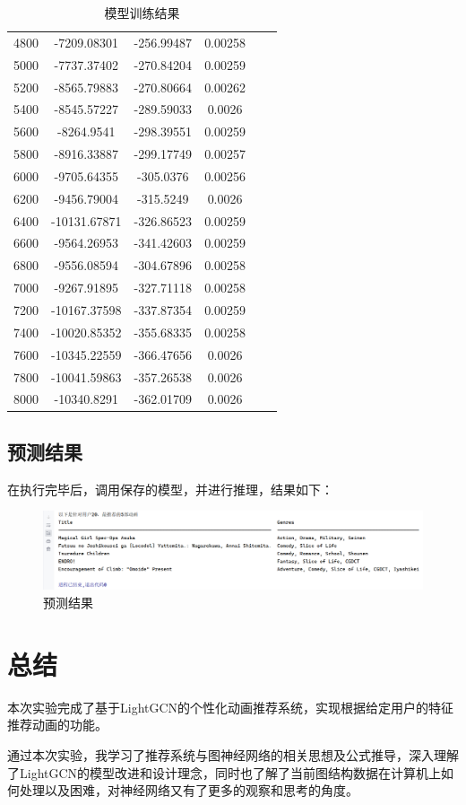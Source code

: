 \documentclass[hyperref,a4paper,UTF8]{ctexart}
\begin{document}
\begin{table}[ht]
\begin{tabular}{l|c|c|c|c|c|}
        4800      & -7209.08301  & -256.99487  & 0.00258   \\
        5000      & -7737.37402  & -270.84204  & 0.00259   \\
        5200      & -8565.79883  & -270.80664  & 0.00262   \\
        5400      & -8545.57227  & -289.59033  & 0.0026    \\
        5600      & -8264.9541   & -298.39551  & 0.00259   \\
        5800      & -8916.33887  & -299.17749  & 0.00257   \\
        6000      & -9705.64355  & -305.0376   & 0.00256   \\
        6200      & -9456.79004  & -315.5249   & 0.0026    \\
        6400      & -10131.67871 & -326.86523  & 0.00259   \\
        6600      & -9564.26953  & -341.42603  & 0.00259   \\
        6800      & -9556.08594  & -304.67896  & 0.00258   \\
        7000      & -9267.91895  & -327.71118  & 0.00258   \\
        7200      & -10167.37598 & -337.87354  & 0.00259   \\
        7400      & -10020.85352 & -355.68335  & 0.00258   \\
        7600      & -10345.22559 & -366.47656  & 0.0026    \\
        7800      & -10041.59863 & -357.26538  & 0.0026    \\
        8000      & -10340.8291  & -362.01709  & 0.0026    \\
        \bottomrule
    \end{tabular}
    \caption{模型训练结果}
    \label{tab:model_trsain_result}
\end{table}

\subsection{预测结果}

在执行完毕后，调用保存的模型，并进行推理，结果如下：

\begin{figure}[ht]
    \centering
    \includegraphics[width=1.0\textwidth]{fig/predict.png}
    \caption{预测结果}
    \label{fig:predict}
\end{figure}


\section{总结}

本次实验完成了基于LightGCN的个性化动画推荐系统，实现根据给定用户的特征推荐动画的功能。

通过本次实验，我学习了推荐系统与图神经网络的相关思想及公式推导，深入理解了LightGCN的模型改进和设计理念，同时也了解了当前图结构数据在计算机上如何处理以及困难，对神经网络又有了更多的观察和思考的角度。


\newpage


\end{document}

